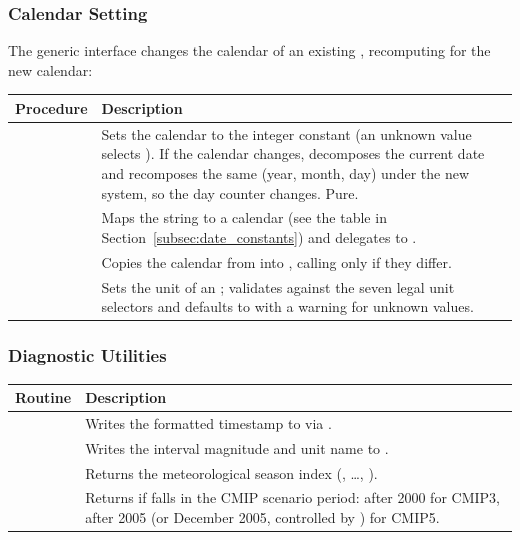 \subsubsection{Calendar Setting}

The generic interface  changes the calendar of an existing
, recomputing 
for the new calendar:

\begin{longtable}{L{5cm} L{9cm}}
  \toprule
  \textbf{Procedure} & \textbf{Description} \\
  \midrule
  \endhead
  \bottomrule
  \endfoot
   &
    Sets the calendar to the integer constant  (an unknown value
    selects ). If the calendar changes, decomposes the
    current date and recomposes the same (year, month, day) under the new
    system, so the day counter changes. Pure. \\
   &
    Maps the string  to a calendar (see the table in
    Section~\ref{subsec:date_constants}) and delegates to
    . \\
   &
    Copies the calendar from  into , calling
     only if they differ. \\
   &
    Sets the unit of an ; validates against the
    seven legal unit selectors and defaults to  with a warning
    for unknown values. \\
\end{longtable}

\subsubsection{Diagnostic Utilities}

\begin{longtable}{L{5.5cm} L{8.5cm}}
  \toprule
  \textbf{Routine} & \textbf{Description} \\
  \midrule
  \endhead
  \bottomrule
  \endfoot
   &
    Writes the formatted timestamp to  via . \\
   &
    Writes the interval magnitude and unit name to . \\
   &
    Returns the meteorological season index
    (, \ldots, ). \\
   &
    Returns  if  falls in the CMIP scenario period:
    after 2000 for CMIP3, after 2005 (or December 2005, controlled by
    ) for CMIP5. \\
\end{longtable}


